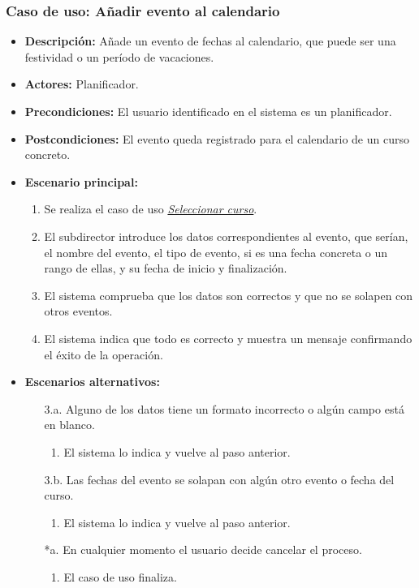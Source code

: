 \subsubsection*{Caso de uso: Añadir evento al calendario}
\begin{itemize}
\item{\bf Descripción:} Añade un evento de fechas al calendario, que puede ser una festividad o un período de vacaciones.
\item{\bf Actores:} Planificador.
\item{\bf Precondiciones:} El usuario identificado en el sistema es un planificador.
\item{\bf Postcondiciones:} El evento queda registrado para el calendario de un curso concreto.
\item{\bf Escenario principal:}
	\begin{enumerate}
	\item Se realiza el caso de uso {\em \hyperref[select_curso]{Seleccionar curso}}.
	\item El subdirector introduce los datos correspondientes al evento, que serían, el nombre del evento, el tipo de evento, si es una fecha concreta o un rango de ellas, y su fecha de inicio y finalización.
	\item El sistema comprueba que los datos son correctos y que no se solapen con otros eventos.
	\item El sistema indica que todo es correcto y muestra un mensaje confirmando el éxito de la operación.
	\end{enumerate}
\item{\bf Escenarios alternativos:}
	\begin{itemize}
		\item[3.a.] Alguno de los datos tiene un formato incorrecto o algún campo está en blanco.
		\begin{enumerate}
			\item El sistema lo indica y vuelve al paso anterior.
		\end{enumerate}
		\item[3.b.] Las fechas del evento se solapan con algún otro evento o fecha del curso.
		\begin{enumerate}
			\item El sistema lo indica y vuelve al paso anterior.
		\end{enumerate}
		\item[*a.] En cualquier momento el usuario decide cancelar el proceso.
		\begin{enumerate}
		\item El caso de uso finaliza.
		\end{enumerate}
	\end{itemize}
\end{itemize}



